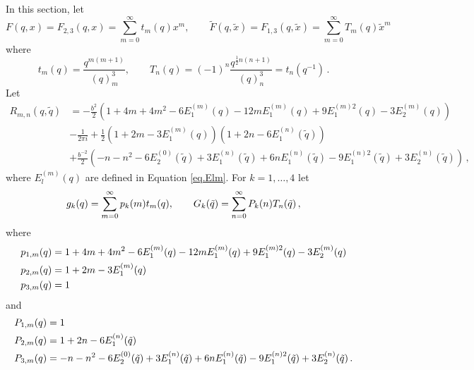 \documentclass[12pt]{amsart}
\theoremstyle{definition}
\def\printname#1{
        \if\draft y
                \smash{\makebox[0pt]{\hspace{-0.5in}
                        \raisebox{8pt}{\tt\tiny #1}}}
        \fi
}
\def\lbl#1{\label{#1}\printname{#1}}
\def\ti{\widetilde}
\def\tq{\tilde{q}}
\begin{document}
In this section, let
$$
F(q,x)=F_{2,3}(q,x)=\sum_{m=0}^\infty t_m(q) x^m, 
\qquad 
\ti F(q,\ti x)=F_{1,3}(q,\ti x)=\sum_{m=0}^\infty T_m(q) \ti x^m
$$
where
$$
t_m(q)=
\frac{q^{m(m+1)}}{(q)^3_m}, \qquad
T_n(q)=(-1)^n
\frac{q^{\frac{1}{2}n(n+1)}}{(q)^3_n} = t_n(q^{-1}) \,.
$$
Let
{\small
\begin{align*}
R_{m,n}(q,\tq) &= -\frac{b^2}{2} \left(
1 + 4 m + 4 m^2   - 6 E^{(m)}_1(q) - 12 m  E^{(m)}_1(q) + 9 E^{(m)2}_1(q) - 3 
E^{(m)}_2(q) \right)
\\
& - \frac{1}{2 \pi i} +  \frac{1}{2}
\left(1 + 2 m - 3 E^{(m)}_1(q)\right)\left(1 + 2 n -6 E^{(n)}_1(\tq)\right) 
\\
& + \frac{b^{-2}}{2} \left( - n - n^2 -6 E^{(0)}_2(\tq) + 3 E^{(n)}_1(\tq) 
+6 n E^{(n)}_1(\tq) - 9 E^{(n)2}_1(\tq) + 3 E^{(n)}_2(\tq) \right) \,,
\end{align*}
}
where $E^{(m)}_l(q)$ are defined in Equation \eqref{eq.Elm}.
For $k=1,\dots,4$ let
\begin{equation}
\lbl{eq.gG52}
g_k(q)=\sum_{m=0}^\infty p_k(m) t_m(q), \qquad 
G_k(\tq)=\sum_{n=0}^\infty P_k(n) T_n(\tq) \,,
\end{equation}
where
{\small
\begin{subequations}
\begin{align}
\lbl{eq.g1}
p_{1,m}(q) &=
1 + 4 m + 4 m^2  -6 E^{(m)}_1(q) - 12 m E^{(m)}_1(q)
+ 9 E^{(m)2}_1(q) - 3 E^{(m)}_2(q) 
\\
\lbl{eq.gg2}
p_{2,m}(q) &= 1 + 2 m - 3 E^{(m)}_1(q)
\\
\lbl{eq.g3}
p_{3,m}(q) &= 1 
\end{align}
\end{subequations}
}
and
{\small
\begin{subequations}
\begin{align}
\lbl{eq.G1}
P_{1,m}(q) &= 1
\\
\lbl{eq.G2}
P_{2,m}(q) &= 1 + 2 n -6 E^{(n)}_1(\tq)
\\
\lbl{eq.G3}
P_{3,m}(q) &= - n - n^2 -6 E^{(0)}_2(\tq) + 3 E^{(n)}_1(\tq) 
+6 n E^{(n)}_1(\tq) - 9 E^{(n)2}_1(\tq) + 3 E^{(n)}_2(\tq) \,.
\end{align}
\end{subequations}
}
\end{document}

